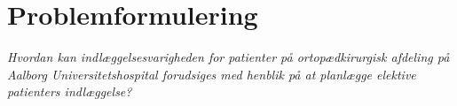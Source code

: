 \section{Problemformulering}
\textit{Hvordan kan indlæggelsesvarigheden for patienter på ortopædkirurgisk afdeling på Aalborg Universitetshospital forudsiges med henblik på at planlægge elektive patienters indlæggelse?}